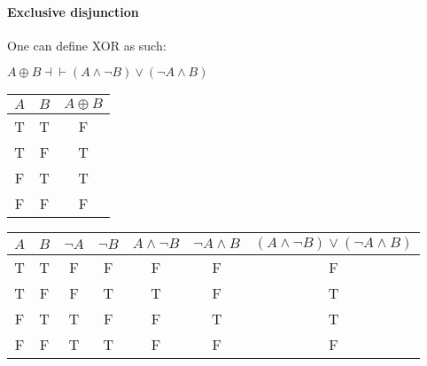\documentclass[11pt]{exam}
\begin{document}
\paragraph*{Exclusive disjunction}
One can define XOR as such:
\begin{center}
    \(A \oplus B \dashv \vdash (A \wedge \neg B)\vee(\neg A \wedge B)\)
\end{center}
\begin{center}
    \begin{tabular}{|c|c|c|}
        \hline
        \(A\) & \(B\) & \(A \oplus B\) \\
        \hline
        T & T & F \\
        T & F & T \\
        F & T & T \\
        F & F & F \\
        \hline
    \end{tabular}
    \begin{tabular}{|c|c|c|c|c|c|c|}
        \hline
        \(A\) & \(B\) & \(\neg A\) & \(\neg B\) & \(A \wedge \neg B\) & \(\neg A \wedge B\) & \((A \wedge \neg B)\vee(\neg A \wedge B)\) \\
        \hline
        T & T & F & F & F & F & F \\
        T & F & F & T & T & F & T \\
        F & T & T & F & F & T & T \\
        F & F & T & T & F & F & F \\
        \hline
    \end{tabular}
\end{center}
\end{document}
